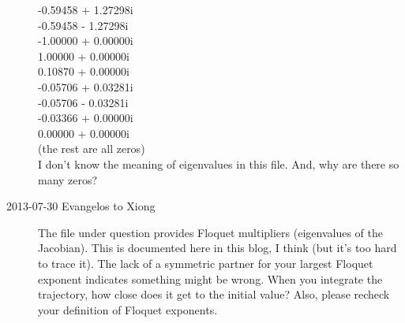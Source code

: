 \begin{description}
      -0.59458 + 1.27298i\\
      -0.59458 - 1.27298i\\
      -1.00000 + 0.00000i\\
       1.00000 + 0.00000i\\
       0.10870 + 0.00000i\\
      -0.05706 + 0.03281i\\
      -0.05706 - 0.03281i\\
      -0.03366 + 0.00000i\\
       0.00000 + 0.00000i\\
       (the rest are all zeros) \\

I don't know the meaning of eigenvalues in this file. And, why are there
so many zeros?

\item[2013-07-30 Evangelos to Xiong]
The file under question provides Floquet multipliers (eigenvalues of the Jacobian). This is documented here in this blog, I think (but it's too hard to trace it).
The lack of a symmetric partner for your largest Floquet exponent indicates something might be wrong. When you integrate the trajectory, how close does it get to
the initial value? Also, please recheck your definition of Floquet exponents.


\end{description}
